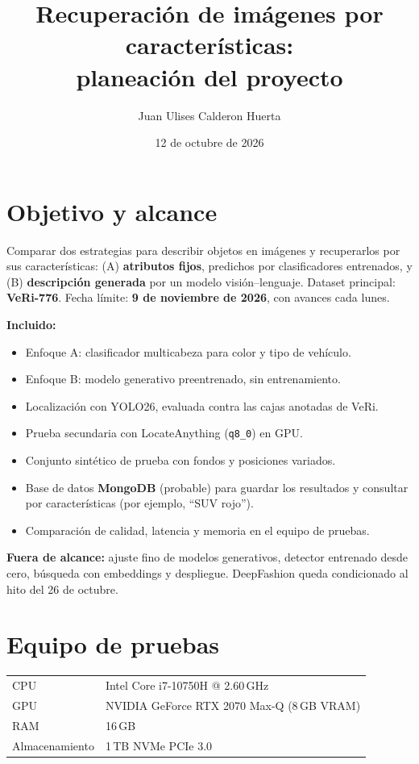 \documentclass[11pt,a4paper]{article}
\title{Recuperaci\'on de im\'agenes por caracter\'isticas:\\ planeaci\'on del proyecto}
\author{Juan Ulises Calderon Huerta}
\date{12 de octubre de 2026}
\begin{document}
\maketitle

\section{Objetivo y alcance}

Comparar dos estrategias para describir objetos en im\'agenes y recuperarlos por sus caracter\'isticas: (A) \textbf{atributos fijos}, predichos por clasificadores entrenados, y (B) \textbf{descripci\'on generada} por un modelo visi\'on--lenguaje. Dataset principal: \textbf{VeRi-776}. Fecha l\'imite: \textbf{9 de noviembre de 2026}, con avances cada lunes.

\textbf{Incluido:}
\begin{itemize}[noitemsep]
  \item Enfoque A: clasificador multicabeza para color y tipo de veh\'iculo.
  \item Enfoque B: modelo generativo preentrenado, sin entrenamiento.
  \item Localizaci\'on con YOLO26, evaluada contra las cajas anotadas de VeRi.
  \item Prueba secundaria con LocateAnything (\texttt{q8\_0}) en GPU.
  \item Conjunto sint\'etico de prueba con fondos y posiciones variados.
   \item Base de datos \textbf{MongoDB} (probable) para guardar los resultados y consultar por caracter\'isticas (por ejemplo, ``SUV rojo'').
  \item Comparaci\'on de calidad, latencia y memoria en el equipo de pruebas.
\end{itemize}

\textbf{Fuera de alcance:} ajuste fino de modelos generativos, detector entrenado desde cero, b\'usqueda con embeddings y despliegue. DeepFashion queda condicionado al hito del 26 de octubre.

\section{Equipo de pruebas}

\begin{tabular}{@{}ll@{}}
\toprule
CPU & Intel Core i7-10750H @ 2.60\,GHz \\
GPU & NVIDIA GeForce RTX 2070 Max-Q (8\,GB VRAM) \\
RAM & 16\,GB \\
Almacenamiento & 1\,TB NVMe PCIe 3.0 \\
\bottomrule
\end{tabular}
\newpage
\end{document}
